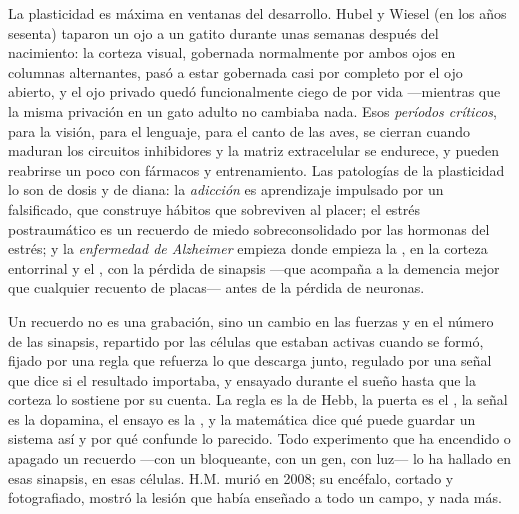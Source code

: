 \begin{definition}\label{def:b3:learning-memory:critical}
La plasticidad es máxima en ventanas del desarrollo. Hubel y Wiesel (en
los años sesenta) taparon un ojo a un gatito durante unas semanas
después del nacimiento: la corteza visual, gobernada normalmente por
ambos ojos en columnas alternantes, pasó a estar gobernada casi por
completo por el ojo abierto, y el ojo privado quedó funcionalmente
ciego de por vida ---mientras que la misma privación en un gato adulto
no cambiaba nada. Esos \emph{períodos críticos}, para la visión, para
el lenguaje, para el canto de las aves, se cierran cuando maduran los
circuitos inhibidores y la matriz extracelular se endurece, y pueden
reabrirse un poco con fármacos y entrenamiento. Las patologías de la
plasticidad lo son de dosis y de diana: la \emph{adicción} es
aprendizaje impulsado por un  falsificado, que
construye hábitos que sobreviven al placer; el estrés postraumático es
un recuerdo de miedo sobreconsolidado por las hormonas del estrés; y la
\emph{enfermedad de Alzheimer} empieza donde empieza la , en la corteza entorrinal y el , con la pérdida de
sinapsis ---que acompaña a la demencia mejor que cualquier recuento de
placas--- antes de la pérdida de neuronas.
\end{definition}

\begin{remark}\label{rem:b3:learning-memory:what}
Un recuerdo no es una grabación, sino un cambio en las fuerzas y en el
número de las sinapsis, repartido por las células que estaban activas
cuando se formó, fijado por una regla que refuerza lo que descarga
junto, regulado por una señal que dice si el resultado importaba, y
ensayado durante el sueño hasta que la corteza lo sostiene por su
cuenta. La regla es la de Hebb, la puerta es el , la señal
es la dopamina, el ensayo es la , y la matemática dice qué
puede guardar un sistema así y por qué confunde lo parecido. Todo
experimento que ha encendido o apagado un recuerdo ---con un
bloqueante, con un gen, con luz--- lo ha hallado en esas sinapsis, en
esas células. H.M. murió en 2008; su encéfalo, cortado y fotografiado,
mostró la lesión que había enseñado a todo un campo, y nada más.
\end{remark}

